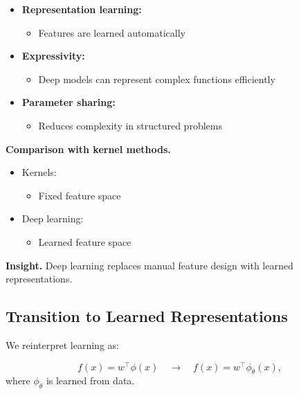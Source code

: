 \begin{itemize}
    \item \textbf{Representation learning:}
    \begin{itemize}
        \item Features are learned automatically
    \end{itemize}

    \item \textbf{Expressivity:}
    \begin{itemize}
        \item Deep models can represent complex functions efficiently
    \end{itemize}

    \item \textbf{Parameter sharing:}
    \begin{itemize}
        \item Reduces complexity in structured problems
    \end{itemize}
\end{itemize}

\medskip

\noindent
\textbf{Comparison with kernel methods.}

\begin{itemize}
    \item Kernels:
    \begin{itemize}
        \item Fixed feature space
    \end{itemize}

    \item Deep learning:
    \begin{itemize}
        \item Learned feature space
    \end{itemize}
\end{itemize}

\medskip

\noindent
\textbf{Insight.}  
Deep learning replaces manual feature design with learned representations.

\subsection{Transition to Learned Representations}

We reinterpret learning as:

\[
f(x) = w^\top \phi(x)
\quad \longrightarrow \quad
f(x) = w^\top \phi_\theta(x),
\]
where $\phi_\theta$ is learned from data.


